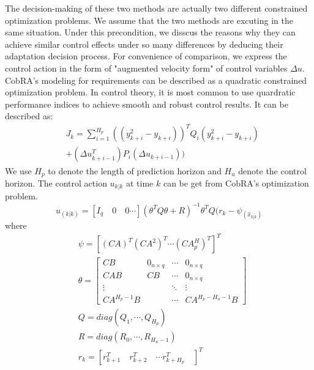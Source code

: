 \documentclass[sigconf]{acmart}
\begin{document}
The decision-making of these two methods are actually two different constrained optimization problems. We assume that the two methods are excuting in the same situation. Under this precondition, we disscus the reasons why they can achieve similar control effects under so many differences by deducing their adaptation decision process. For convenience of comparison, we express the control action in the form of "augmented velocity form" of control variables $\Delta u$.
CobRA's modeling for requirements can be described as a quadratic constrained optimization problem. In control theory, it is most common to use quardratic performance indices to achieve smooth and robust control results. It can be described as:
\begin{equation}
	\begin{aligned}
		&J_k=\sum_{i=1}^{H_p}((y_{k+i}^2-y_{k+i}))^TQ_i(y_{k+i}^2-y_{k+i})\\
		&+(\Delta u_{k+i-1}^T)P_i(\Delta u_{k+i-1}))
	\end{aligned}
\end{equation}
We use $H_p$ to denote the length of prediction horizon and $H_u$ denote the control horizon. The control action $u_{k|k}$ at time $k$ can be get from CobRA's optimization problem.
\begin{equation}
	u_(k|k)=[I_q\quad 0\quad 0\cdots](\theta^T Q\theta+R)^{-1}\theta^T Q(r_k-\psi _(\hat{x}_{k|k})
\end{equation}
where
\begin{equation}
	\begin{aligned}
		&\psi=[(CA)^T (CA^2)^T\cdots(CA^H_p)^T]^T\\
		&\theta=
		\left[
		\begin{matrix}
			CB & 0_{n\times q} &\cdots & 0_{n\times q} \\
			CAB & CB& \cdots   & 0_{n\times q}\\
			\vdots & \quad& \ddots&\vdots\\
			CA^{H_p-1}B& \quad&\cdots&CA^{H_p-H_u-1}B
		\end{matrix}
		\right]\\
		&Q=diag(Q_1,\cdots,Q_{H_p})\\
		&R=diag(R_0,\cdots,R_{H_u-1})\\
		&r_k=[r_{k+1}^T\quad r_{k+2}^T\quad \cdots r_{k+H_p}^T\quad]^T
	\end{aligned}
\end{equation}
\end{document}

